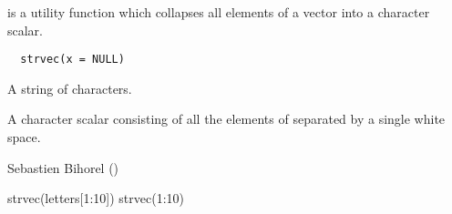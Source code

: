 %
\begin{Description}\relax
{} is a utility function which collapses all elements of a vector
into a character scalar.
\end{Description}
%
\begin{Usage}
\begin{verbatim}
  strvec(x = NULL)
\end{verbatim}
\end{Usage}
%
\begin{Arguments}
\begin{ldescription}
\item[\code{x}] A string of characters.
\end{ldescription}
\end{Arguments}
%
\begin{Value}
A character scalar consisting of all the elements of  separated by a
single white space.
\end{Value}
%
\begin{Author}\relax
Sebastien Bihorel ()
\end{Author}
%
\begin{Examples}
\begin{ExampleCode}
  strvec(letters[1:10])
  strvec(1:10)
\end{ExampleCode}
\end{Examples}
